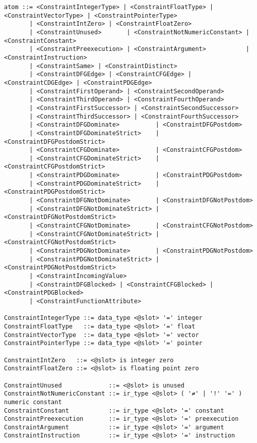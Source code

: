 \begin{lstlisting}[language=BNF,basicstyle=\small\ttfamily,
                   numbers=none,framexleftmargin=0pt,xleftmargin=0pt,]
atom ::= <ConstraintIntegerType> | <ConstraintFloatType> | <ConstraintVectorType> | <ConstraintPointerType>
       | <ConstraintIntZero> | <ConstraintFloatZero>
       | <ConstraintUnused>       | <ConstraintNotNumericConstant> | <ConstraintConstant>
       | <ConstraintPreexecution> | <ConstraintArgument>           | <ConstraintInstruction>
       | <ConstraintSame> | <ConstraintDistinct>
       | <ConstraintDFGEdge> | <ConstraintCFGEdge> | <ConstraintCDGEdge> | <ConstraintPDGEdge>
       | <ConstraintFirstOperand> | <ConstraintSecondOperand>
       | <ConstraintThirdOperand> | <ConstraintFourthOperand>
       | <ConstraintFirstSuccessor> | <ConstraintSecondSuccessor>
       | <ConstraintThirdSuccessor> | <ConstraintFourthSuccessor>
       | <ConstraintDFGDominate>          | <ConstraintDFGPostdom>
       | <ConstraintDFGDominateStrict>    | <ConstraintDFGPostdomStrict>
       | <ConstraintCFGDominate>          | <ConstraintCFGPostdom>
       | <ConstraintCFGDominateStrict>    | <ConstraintCFGPostdomStrict>
       | <ConstraintPDGDominate>          | <ConstraintPDGPostdom>
       | <ConstraintPDGDominateStrict>    | <ConstraintPDGPostdomStrict>
       | <ConstraintDFGNotDominate>       | <ConstraintDFGNotPostdom>
       | <ConstraintDFGNotDominateStrict> | <ConstraintDFGNotPostdomStrict>
       | <ConstraintCFGNotDominate>       | <ConstraintCFGNotPostdom>
       | <ConstraintCFGNotDominateStrict> | <ConstraintCFGNotPostdomStrict>
       | <ConstraintPDGNotDominate>       | <ConstraintPDGNotPostdom>
       | <ConstraintPDGNotDominateStrict> | <ConstraintPDGNotPostdomStrict>
       | <ConstraintIncomingValue>
       | <ConstraintDFGBlocked> | <ConstraintCFGBlocked> | <ConstraintPDGBlocked>
       | <ConstraintFunctionAttribute>

ConstraintIntegerType ::= data_type <@slot> '=' integer
ConstraintFloatType   ::= data_type <@slot> '=' float
ConstraintVectorType  ::= data_type <@slot> '=' vector
ConstraintPointerType ::= data_type <@slot> '=' pointer

ConstraintIntZero   ::= <@slot> is integer zero
ConstraintFloatZero ::= <@slot> is floating point zero

ConstraintUnused             ::= <@slot> is unused
ConstraintNotNumericConstant ::= ir_type <@slot> ( '≠' | '!' '=' ) numeric constant
ConstraintConstant           ::= ir_type <@slot> '=' constant
ConstraintPreexecution       ::= ir_type <@slot> '=' preexecution
ConstraintArgument           ::= ir_type <@slot> '=' argument
ConstraintInstruction        ::= ir_type <@slot> '=' instruction


\end{lstlisting}
